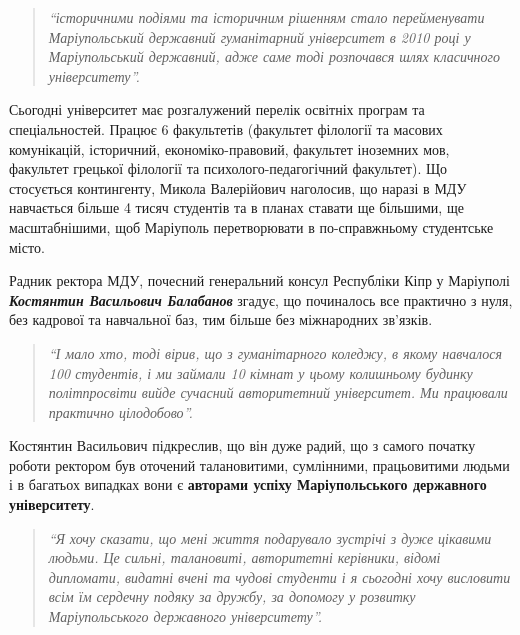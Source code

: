 \begin{quote}
\em\enquote{історичними подіями та
історичним рішенням стало перейменувати Маріупольський державний гуманітарний
університет в 2010 році у Маріупольський державний, адже саме тоді розпочався
шлях класичного університету}. 
\end{quote}

Сьогодні університет має розгалужений перелік освітніх програм та
спеціальностей. Працює 6 факультетів (факультет філології та масових
комунікацій, історичний, економіко-правовий, факультет іноземних мов, факультет
грецької філології та психолого-педагогічний факультет). Що стосується
контингенту, Микола Валерійович наголосив, що наразі в МДУ навчається більше 4
тисяч студентів та в планах ставати ще більшими, ще масштабнішими, щоб
Маріуполь перетворювати в по-справжньому студентське місто.


Радник ректора МДУ, почесний генеральний консул Республіки Кіпр у Маріуполі
\emph{\textbf{Костянтин Васильович Балабанов}} згадує, що починалось все практично з нуля, без
кадрової та навчальної баз, тим більше без міжнародних зв'язків. 

\begin{quote}
\em\enquote{І мало хто,
тоді вірив, що з гуманітарного коледжу, в якому навчалося 100 студентів, і ми
займали 10 кімнат у цьому колишньому будинку політпросвіти вийде сучасний
авторитетний університет. Ми працювали практично цілодобово}. 
\end{quote}

Костянтин Васильович підкреслив, що він дуже радий, що з самого початку роботи ректором
був оточений талановитими, сумлінними, працьовитими людьми і в багатьох
випадках вони є \textbf{авторами успіху Маріупольського державного університету}. 

\begin{quote}
\em\enquote{Я хочу сказати, що мені життя подарувало зустрічі з дуже цікавими людьми. Це
сильні, талановиті, авторитетні керівники, відомі дипломати, видатні вчені та
чудові студенти і я сьогодні хочу висловити всім їм сердечну подяку за дружбу,
за допомогу у розвитку Маріупольського державного університету}.
\end{quote}


